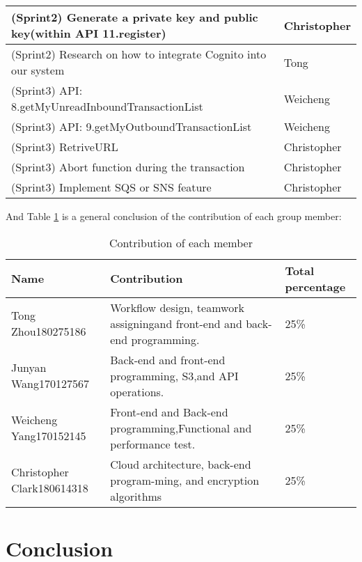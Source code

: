 \documentclass[runningheads]{llncs}
\begin{document}
\begin{table}[H]
\begin{threeparttable}
\begin{tabular} {p{7cm}|p{2.5cm}<{\centering}}
        	\hline
        	(Sprint2) Generate a private key and public key(within API 11.register) & Christopher\\
        	\hline
        	(Sprint2) Research on how to integrate Cognito into our system & Tong\\
        	\hline
        	(Sprint3) API: 8.getMyUnreadInboundTransactionList & Weicheng\\
        	\hline
        	(Sprint3) API: 9.getMyOutboundTransactionList & Weicheng\\
        	\hline
        	(Sprint3) RetriveURL & Christopher\\
        	\hline
        	(Sprint3) Abort function during the transaction & Christopher\\
        	\hline
        	(Sprint3) Implement SQS or SNS feature & Christopher\\
        	\hline
 
      		\bottomrule
    		\end{tabular}
    	\end{threeparttable}   
	\end{table}


And Table \ref{table:Contribution} is a general conclusion of the contribution of each group member:
	\begin{table}[H] %
    	\centering
    	\caption{Contribution of each member}
    	\label{table:Contribution} 
    	\begin{threeparttable}
    		\begin{tabular} {p{2.5cm}|p{7cm}|p{2.5cm}<{\centering}}
    		\toprule
      		Name & Contribution & Total percentage \\
      		\midrule
        	Tong Zhou180275186 & Workflow   design,   teamwork   assigningand front-end and back-end programming. & 25\% \\
        	\hline
        	Junyan Wang170127567 & Back-end and front-end programming, S3,and API operations. & 25\% \\
        	\hline
        	Weicheng Yang170152145 & Front-end   and   Back-end   programming,Functional and performance test. & 25\% \\
        	\hline
        	Christopher Clark180614318 & Cloud   architecture,   back-end   program-ming, and encryption algorithms & 25\% \\
 
      		\bottomrule
    		\end{tabular}
    	\end{threeparttable}   
	\end{table}


\section{Conclusion}

\newpage


\end{document}
